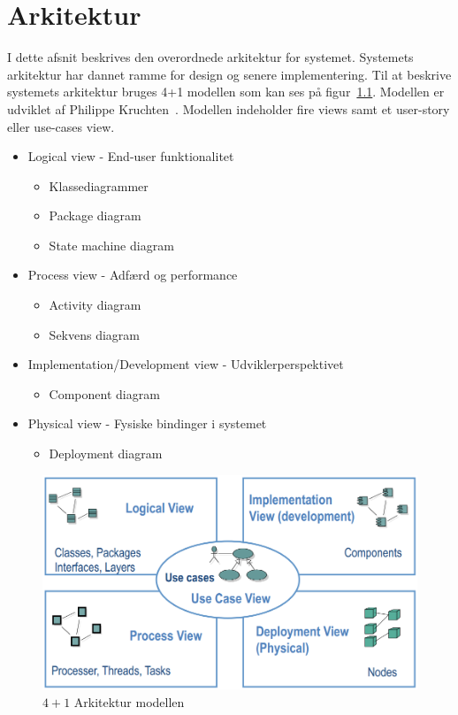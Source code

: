 \chapter{Arkitektur}


I dette afsnit beskrives den overordnede arkitektur for systemet. Systemets arkitektur har dannet ramme for design og senere implementering. Til at beskrive systemets arkitektur bruges 4+1 modellen som kan ses på figur~\ref{fig:41model}. Modellen er udviklet af Philippe Kruchten~\cite{fcgss2007}. Modellen indeholder fire views samt et user-story eller use-cases view.

\begin{itemize}
	\item Logical view - End-user funktionalitet
	\begin{itemize}
		\item Klassediagrammer
		\item Package diagram
		\item State machine diagram
	\end{itemize}
	\item Process view - Adfærd og performance
	\begin{itemize}
		\item Activity diagram
		\item Sekvens diagram
	\end{itemize}
	\item Implementation/Development view - Udviklerperspektivet
	\begin{itemize}
		\item Component diagram
	\end{itemize}
	\item Physical view - Fysiske bindinger i systemet
	\begin{itemize}
		\item Deployment diagram
	\end{itemize}
\end{itemize}

\begin{figure}[h]
	\centering
	\includegraphics[width=0.8\linewidth]{figs/arkitektur/41model}
	\caption{$4+1$ Arkitektur modellen \cite{flylib}}
	\label{fig:41model}
\end{figure}

